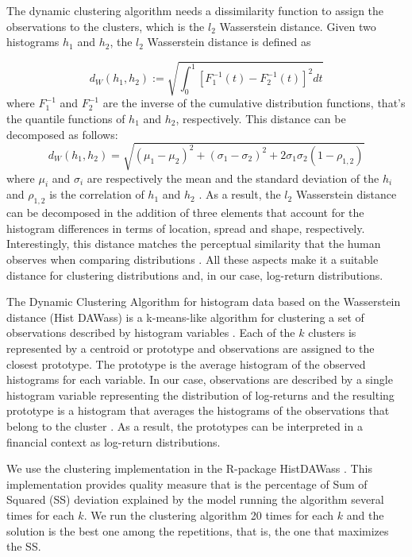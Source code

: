 \documentclass{bmcart}
\begin{document}
The dynamic clustering algorithm needs a dissimilarity function to assign the observations to the clusters, which is the $\mathit{l}_2$ Wasserstein distance. Given two histograms $h_1$ and $h_2$, the  $\mathit{l}_2$ Wasserstein distance is defined as

\begin{equation}
	d_W(h_1,h_{2}):=\sqrt{\int_{0}^{1}\left[F_1^{-1}(t)-F_{2}^{-1}(t)\right]^2dt}
\end{equation}
where $F_1^{-1}$ and $F_{2}^{-1}$ are the inverse of the cumulative distribution functions, that's the quantile functions of $h_1$ and $h_2$, respectively. This distance can be decomposed as follows: 
\begin{equation}
	d_W(h_1,h_{2})=\sqrt{\left(\mu_1-\mu_{2}\right)^2 + \left(\sigma_1-\sigma_{2}\right)^2+2\sigma_1\sigma_{2}\left(1-\rho_{1,2}\right)}
\end{equation}where $\mu_i$ and $\sigma_i$ are respectively the mean and the standard deviation of the $h_i$ and $\rho_{1,2}$ is the correlation of $h_1$ and $h_2$ \cite{Irpino2015BasicSF}. As a result, the $\mathit{l}_2$ Wasserstein distance can be decomposed in the addition of three elements that account for the histogram differences in terms of location, spread and shape, respectively. Interestingly, this distance matches the perceptual similarity that the human observes when comparing distributions \cite{Arroyo2009}. All these aspects make it a suitable distance for clustering distributions and, in our case, log-return distributions.

The Dynamic Clustering Algorithm for histogram data based on the Wasserstein distance (Hist DAWass) is a k-means-like algorithm for clustering a set of observations described by histogram variables \cite{Irpino2006, HistogramClust2013}. Each of the $k$ clusters is represented by a centroid or prototype and observations are assigned to the closest prototype. The prototype is the average histogram of the observed histograms for each variable. In our case, observations are described by a single histogram variable representing the distribution of log-returns and the resulting prototype is a histogram that averages the histograms of the observations that belong to the cluster \cite{Irpino2015BasicSF}. As a result, the prototypes can be interpreted in a financial context as log-return distributions.

We use the clustering implementation in the R-package HistDAWass \cite{Irpino2016}. This implementation provides quality measure that is the percentage of Sum of Squared (SS) deviation explained by the model running the algorithm several times for each $k$. We run the clustering algorithm 20 times for each $k$ and the solution is the best one among the repetitions, that is, the one that maximizes the SS. 
\end{document}
